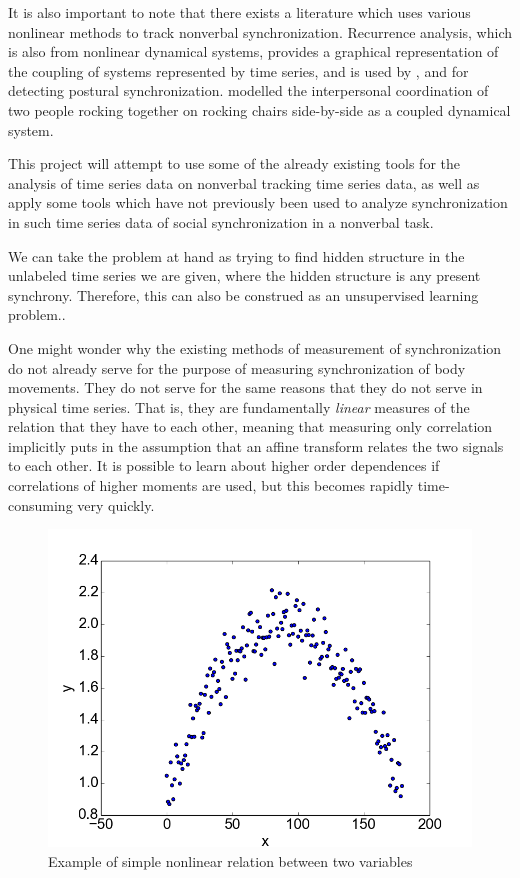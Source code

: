 \documentclass[12pt]{article}
\begin{document}
It is also important to note that there exists a literature which uses various nonlinear methods to track nonverbal synchronization. Recurrence analysis, which is also from nonlinear dynamical systems, provides a graphical representation of the coupling of systems represented by time series, and is used by \cite{webber}, \cite{musicians} and \cite{puzzles} for detecting postural synchronization. \cite{richardson} modelled the interpersonal coordination of two people rocking together on rocking chairs side-by-side as a coupled dynamical system.

This project will attempt to use some of the already existing tools for the analysis of time series data on nonverbal tracking time series data, as well as apply some tools which have not previously been used to analyze synchronization in such time series data of social synchronization in a nonverbal task.

We can take the problem at hand as trying to find hidden structure in the unlabeled time series we are given, where the hidden structure is any present synchrony. Therefore, this can also be construed as an unsupervised learning problem.\cite{socialsync}.

One might wonder why the existing methods of measurement of synchronization do not already serve for the purpose of measuring synchronization of body movements. They do not serve for the same reasons that they do not serve in physical time series. That is, they are fundamentally \emph{linear} measures of the relation that they have to each other, meaning that measuring only correlation implicitly puts in the assumption that an affine transform relates the two signals to each other. It is possible to learn about higher order dependences if correlations of higher moments are used, but this becomes rapidly time-consuming very quickly\cite{pompe}.

\begin{figure}
  \centering
  \includegraphics[scale=0.5]{mi_ex}
  \caption{Example of simple nonlinear relation between two variables}
  \label{fig:nonlinearity}
\end{figure}
\end{document}
